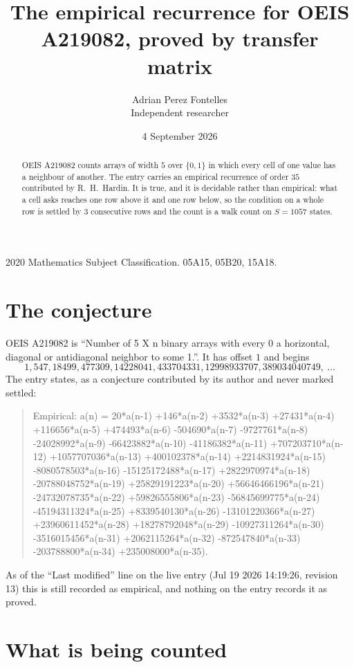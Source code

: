 \documentclass[11pt,a4paper]{article}
\title{The empirical recurrence for OEIS A219082, proved by transfer matrix}
\author{Adrian Perez Fontelles\\ \small Independent researcher}
\date{4 September 2026}
\theoremstyle{plain}
\theoremstyle{definition}
\begin{document}
\maketitle

\begin{abstract}
OEIS A219082 counts arrays of width $5$ over $\{0,1\}$ in which every cell of one value has a neighbour of another. The entry carries an
empirical recurrence of order $35$ contributed by R.~H.~Hardin. It is true, and it is
decidable rather than empirical: what a cell asks reaches one row above it and one row below, so the
condition on a whole row is settled by $3$ consecutive rows and the count is a walk
count on $S=1057$ states.
\end{abstract}

\noindent\small 2020 Mathematics Subject Classification. 05A15, 05B20, 15A18.\normalsize

\section{The conjecture}

OEIS A219082 is ``Number of 5 X n binary arrays with every 0 a horizontal, diagonal or antidiagonal neighbor to some 1.''. It has offset $1$ and begins
\[
1, 547, 18499, 477309, 14228041, 433704331, 12998933707, 389034040749,\ \dots
\]
The entry states, as a conjecture contributed by its author and never marked settled:
\begin{quote}
Empirical: a(n) = 20*a(n-1) +146*a(n-2) +3532*a(n-3) +27431*a(n-4) +116656*a(n-5) +474493*a(n-6) -504690*a(n-7) -9727761*a(n-8) -24028992*a(n-9) -66423882*a(n-10) -41186382*a(n-11) +707203710*a(n-12) +1057707036*a(n-13) +400102378*a(n-14) +2214831924*a(n-15) -8080578503*a(n-16) -15125172488*a(n-17) +2822970974*a(n-18) -20788048752*a(n-19) +25829191223*a(n-20) +56646466196*a(n-21) -24732078735*a(n-22) +59826555806*a(n-23) -56845699775*a(n-24) -45194311324*a(n-25) +8339540130*a(n-26) -13101220366*a(n-27) +23960611452*a(n-28) +18278792048*a(n-29) -10927311264*a(n-30) -3516015456*a(n-31) +2062115264*a(n-32) -872547840*a(n-33) -203788800*a(n-34) +235008000*a(n-35).
\end{quote}
As of the ``Last modified'' line on the live entry (Jul 19 2026 14:19:26, revision 13) this is still
recorded as empirical, and nothing on the entry records it as proved.

\section{What is being counted}
\end{document}
